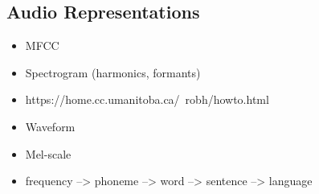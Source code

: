 \subsection{Audio Representations}
\label{sec:audio_representations}
    \begin{itemize}
        \item MFCC
        \item Spectrogram (harmonics, formants)
        \item https://home.cc.umanitoba.ca/~robh/howto.html
        \item Waveform
        \item Mel-scale
        \item frequency --> phoneme --> word --> sentence --> language
    \end{itemize}
